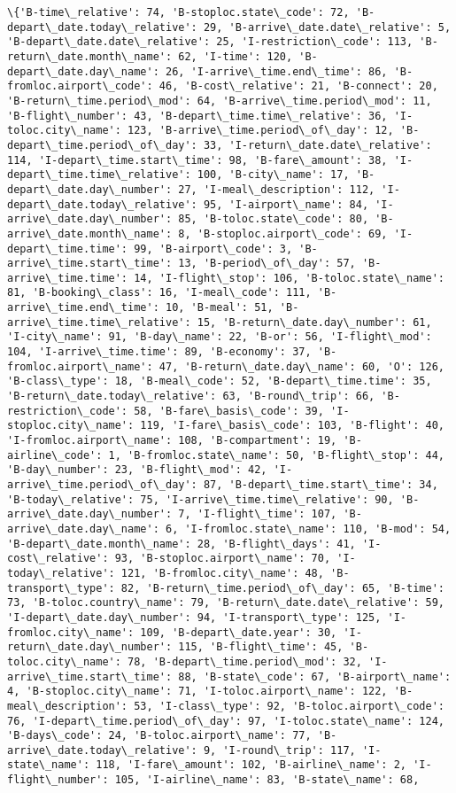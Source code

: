 \documentclass[11pt]{article}
\begin{document}
\begin{Verbatim}[commandchars=\\\{\}]
\{'B-time\_relative': 74, 'B-stoploc.state\_code': 72, 'B-depart\_date.today\_relative': 29, 'B-arrive\_date.date\_relative': 5, 'B-depart\_date.date\_relative': 25, 'I-restriction\_code': 113, 'B-return\_date.month\_name': 62, 'I-time': 120, 'B-depart\_date.day\_name': 26, 'I-arrive\_time.end\_time': 86, 'B-fromloc.airport\_code': 46, 'B-cost\_relative': 21, 'B-connect': 20, 'B-return\_time.period\_mod': 64, 'B-arrive\_time.period\_mod': 11, 'B-flight\_number': 43, 'B-depart\_time.time\_relative': 36, 'I-toloc.city\_name': 123, 'B-arrive\_time.period\_of\_day': 12, 'B-depart\_time.period\_of\_day': 33, 'I-return\_date.date\_relative': 114, 'I-depart\_time.start\_time': 98, 'B-fare\_amount': 38, 'I-depart\_time.time\_relative': 100, 'B-city\_name': 17, 'B-depart\_date.day\_number': 27, 'I-meal\_description': 112, 'I-depart\_date.today\_relative': 95, 'I-airport\_name': 84, 'I-arrive\_date.day\_number': 85, 'B-toloc.state\_code': 80, 'B-arrive\_date.month\_name': 8, 'B-stoploc.airport\_code': 69, 'I-depart\_time.time': 99, 'B-airport\_code': 3, 'B-arrive\_time.start\_time': 13, 'B-period\_of\_day': 57, 'B-arrive\_time.time': 14, 'I-flight\_stop': 106, 'B-toloc.state\_name': 81, 'B-booking\_class': 16, 'I-meal\_code': 111, 'B-arrive\_time.end\_time': 10, 'B-meal': 51, 'B-arrive\_time.time\_relative': 15, 'B-return\_date.day\_number': 61, 'I-city\_name': 91, 'B-day\_name': 22, 'B-or': 56, 'I-flight\_mod': 104, 'I-arrive\_time.time': 89, 'B-economy': 37, 'B-fromloc.airport\_name': 47, 'B-return\_date.day\_name': 60, 'O': 126, 'B-class\_type': 18, 'B-meal\_code': 52, 'B-depart\_time.time': 35, 'B-return\_date.today\_relative': 63, 'B-round\_trip': 66, 'B-restriction\_code': 58, 'B-fare\_basis\_code': 39, 'I-stoploc.city\_name': 119, 'I-fare\_basis\_code': 103, 'B-flight': 40, 'I-fromloc.airport\_name': 108, 'B-compartment': 19, 'B-airline\_code': 1, 'B-fromloc.state\_name': 50, 'B-flight\_stop': 44, 'B-day\_number': 23, 'B-flight\_mod': 42, 'I-arrive\_time.period\_of\_day': 87, 'B-depart\_time.start\_time': 34, 'B-today\_relative': 75, 'I-arrive\_time.time\_relative': 90, 'B-arrive\_date.day\_number': 7, 'I-flight\_time': 107, 'B-arrive\_date.day\_name': 6, 'I-fromloc.state\_name': 110, 'B-mod': 54, 'B-depart\_date.month\_name': 28, 'B-flight\_days': 41, 'I-cost\_relative': 93, 'B-stoploc.airport\_name': 70, 'I-today\_relative': 121, 'B-fromloc.city\_name': 48, 'B-transport\_type': 82, 'B-return\_time.period\_of\_day': 65, 'B-time': 73, 'B-toloc.country\_name': 79, 'B-return\_date.date\_relative': 59, 'I-depart\_date.day\_number': 94, 'I-transport\_type': 125, 'I-fromloc.city\_name': 109, 'B-depart\_date.year': 30, 'I-return\_date.day\_number': 115, 'B-flight\_time': 45, 'B-toloc.city\_name': 78, 'B-depart\_time.period\_mod': 32, 'I-arrive\_time.start\_time': 88, 'B-state\_code': 67, 'B-airport\_name': 4, 'B-stoploc.city\_name': 71, 'I-toloc.airport\_name': 122, 'B-meal\_description': 53, 'I-class\_type': 92, 'B-toloc.airport\_code': 76, 'I-depart\_time.period\_of\_day': 97, 'I-toloc.state\_name': 124, 'B-days\_code': 24, 'B-toloc.airport\_name': 77, 'B-arrive\_date.today\_relative': 9, 'I-round\_trip': 117, 'I-state\_name': 118, 'I-fare\_amount': 102, 'B-airline\_name': 2, 'I-flight\_number': 105, 'I-airline\_name': 83, 'B-state\_name': 68, 
\end{Verbatim}
\end{document}
